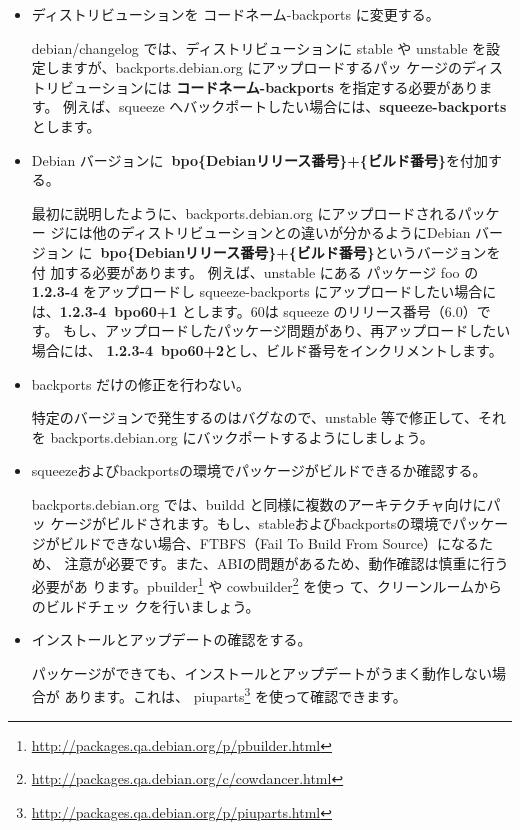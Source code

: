 \documentclass[mingoth,a4paper]{jsarticle}
\begin{document}
\begin{itemize}

\item ディストリビューションを コードネーム-backports に変更する。


debian/changelog では、ディストリビューションに stable
や unstable を設定しますが、backports.debian.org にアップロードするパッ
ケージのディストリビューションには {\bf{コードネーム-backports}} を指定する必要があります。
例えば、squeeze へバックポートしたい場合には、{\bf{squeeze-backports}}とします。


\item Debian バージョンに{\bf{~{}bpo\{Debianリリース番号\}+\{ビルド番号\}}}を付加する。

最初に説明したように、backports.debian.org にアップロードされるパッケー
ジには他のディストリビューションとの違いが分かるようにDebian バージョン
に{\bf{~{}bpo\{Debianリリース番号\}+\{ビルド番号\}}}というバージョンを付
加する必要があります。
例えば、unstable にある パッケージ foo の {\bf{1.2.3-4}} をアップロードし
squeeze-backports にアップロードしたい場合には、{\bf{1.2.3-4~{}bpo60+1}}
とします。60は squeeze のリリース番号（6.0）です。
もし、アップロードしたパッケージ問題があり、再アップロードしたい場合には、
{\bf{1.2.3-4~{}bpo60+2}}とし、ビルド番号をインクリメントします。



\item backports だけの修正を行わない。

特定のバージョンで発生するのはバグなので、unstable 等で修正して、それを
backports.debian.org にバックポートするようにしましょう。

\item squeezeおよびbackportsの環境でパッケージがビルドできるか確認する。

backports.debian.org では、buildd と同様に複数のアーキテクチャ向けにパッ
ケージがビルドされます。もし、stableおよびbackportsの環境でパッケー
ジがビルドできない場合、FTBFS（Fail To Build From Source）になるため、
注意が必要です。また、ABIの問題があるため、動作確認は慎重に行う必要があ
ります。pbuilder\footnote{\url{http://packages.qa.debian.org/p/pbuilder.html}}
や
cowbuilder\footnote{\url{http://packages.qa.debian.org/c/cowdancer.html}} を使っ
て、クリーンルームからのビルドチェッ
クを行いましょう。

\item インストールとアップデートの確認をする。

パッケージができても、インストールとアップデートがうまく動作しない場合が
あります。これは、
piuparts\footnote{\url{http://packages.qa.debian.org/p/piuparts.html}}
を使って確認できます。

\end{itemize}
\end{document}
